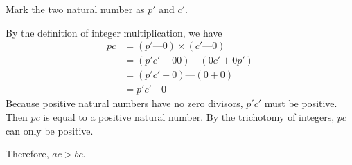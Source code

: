 \documentclass[12pt]{article}
\newcommand{\dsh}{\text{---}}
\begin{document}
\begin{flushleft}
\begin{enumerate}[(a)]
    Mark the two natural number as \(p'\) and \(c'\).

    By the definition of integer multiplication, we have
    \begin{equation*}
      \begin{aligned}
        pc &= (p' \dsh 0) \times (c' \dsh 0)\\
        &= (p'c' + 00)\dsh (0c' + 0p')\\
        &= (p'c' + 0)\dsh (0 + 0)\\
        &= p'c' \dsh 0
      \end{aligned}
    \end{equation*}
    Because positive natural numbers have no zero divisors, \(p'c'\) must be positive.
    Then \(pc\) is equal to a positive natural number.
    By the trichotomy of integers, \(pc\) can only be positive.

    Therefore, \(ac > bc\).
\end{enumerate}

\end{flushleft}
\end{document}
